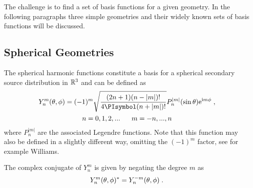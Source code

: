 The challenge is to find a set of basis functions for a given geometry. In
the following paragraphs three simple geometries and their widely known sets of basis
functions will be discussed.

\subsection{Spherical Geometries}
\label{sec:spherical_geometries}

The spherical
harmonic functions constitute a basis for a spherical secondary source distribution
in $\mathbb{R}^3$ and can be defined as\autocite[][(12.153), $\sin\theta$ is used here instead
of $\cos\theta$ due to the use of
another coordinate system, compare Figure\,2.1 from Gumerov and Duraiswami and
Figure\,\ref{fig:coordinate_system} in this thesis.]{Gumerov2004}
%
\begin{gather}
    Y_n^m(\theta,\phi) = (-1)^m \sqrt{\frac{(2n+1)(n-|m|)!}{4\PI(n+|m|)!}}
    P_n^{|m|}(\sin\theta) \E^{\I m\phi} \qc
    \label{eq:Y} \\
    n = 0,1,2,... \;\;\;\;\;\; m = -n,...,n
    \notag
\end{gather}
%
where $P_n^{|m|}$ are the associated Legendre functions. Note that this function
may also be defined in a slightly different way, omitting the $(-1)^m$ factor,
see for example Williams.\autocite[][(6.20)]{Williams1999}

The complex conjugate of $Y_n^m$ is given by negating the degree $m$ as
%
\begin{equation}
    Y_n^m(\theta,\phi)^* = Y_n^{-m}(\theta,\phi) \qp
    \label{eq:Y_complex_conjugate}
\end{equation}
%

